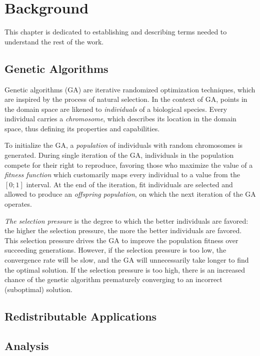 \chapter{Background}
This chapter is dedicated to establishing and describing terms needed to understand the rest of the work.

\section{Genetic Algorithms}
Genetic algorithms (GA) are iterative randomized optimization techniques, which are inspired by the process of natural selection. In the context of GA, points in the domain space are likened to \textit{individuals} of a biological species. Every individual carries a \textit{chromosome}, which describes its location in the domain space, thus defining its properties and capabilities.

To initialize the GA, a \textit{population} of individuals with random chromosomes is generated. During single iteration of the GA, individuals in the population compete for their right to reproduce, favoring those who maximize the value of a \textit{fitness function} which customarily maps every individual to a value from the $[0;1]$ interval. At the end of the iteration, fit individuals are selected and allowed to produce an \textit{offspring population}, on which the next iteration of the GA operates.

\textit{The selection pressure} is the degree to which the better individuals are favored: the higher the selection pressure, the more the better individuals are favored. This selection pressure drives the GA to improve the population fitness over succeeding generations. However, if the selection pressure is too low, the convergence rate will be slow, and the GA will unnecessarily take longer to find the optimal solution. If the selection pressure is too high, there is an increased chance of the genetic algorithm prematurely converging to an incorrect (suboptimal) solution. \cite{GaTournamentSelection}

\section{Redistributable Applications}
\todo

\section{Analysis}
\todo

